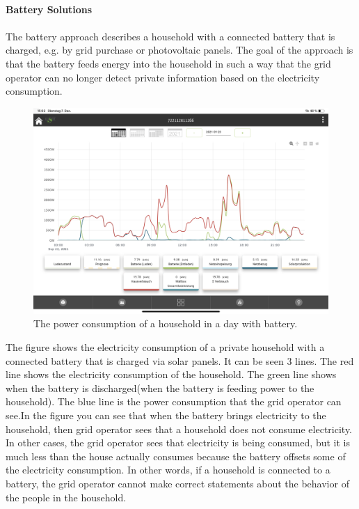 \\
\textbf{Battery Solutions}
\\
\\
The battery approach describes a household with a connected battery that is charged, e.g. by grid purchase or photovoltaic panels. The goal of the approach is that the battery feeds energy into the household in such a way that the grid operator can no longer detect private information based on the electricity consumption. \\
\begin{figure}[tbp]
  \centering
  \includegraphics[width=1\textwidth]{images/Battery.jpg}
  \caption[Short description]{The power consumption of a household in a day with battery.}
  \label{fig:Battery}
\end{figure}
The figure shows the electricity consumption of a private household with a connected battery that is charged via solar panels. It can be seen 3 lines. The red line shows the electricity consumption of the household. The green line shows when the battery is discharged(when the battery is feeding power to the household). The blue line is the power consumption that the grid operator can see.In the figure you can see that when the battery brings electricity to the household, then grid operator sees that a household does not consume electricity. In other cases, the grid operator sees that electricity is being consumed, but it is much less than the house actually consumes because the battery offsets some of the electricity consumption. In other words, if a household is connected to a battery, the grid operator cannot make correct statements about the behavior of the people in the household. \\
